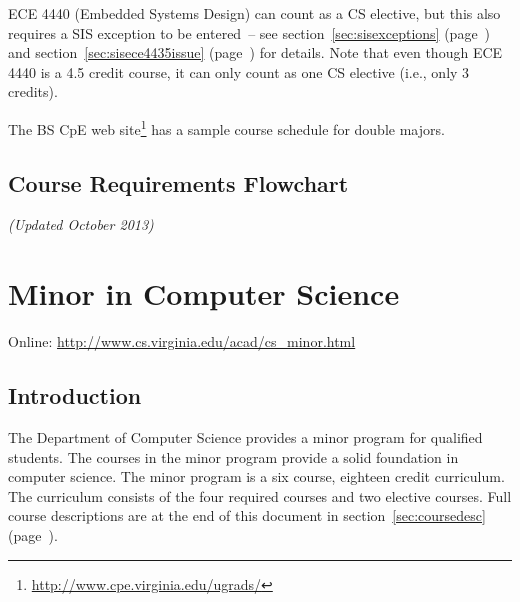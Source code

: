 \documentclass[10pt,letter,twocolumn]{book}
\newcommand{\mychapter}[2]{\chapter{#1}\renewcommand{\leftmark}{\textsc{#2}}}
\newcommand{\mysection}[1]{\section{#1}\renewcommand{\rightmark}{#1}}
\newcommand{\myurl}[1]{\footnote{\scriptsize\url{#1}}}
\begin{document}
ECE 4440 (Embedded Systems Design) can count as a CS elective, but
this also requires a SIS exception to be entered~-- see
section~\ref{sec:sisexceptions} (page~\pageref{sec:sisexceptions})
and section~\ref{sec:sisece4435issue} (page~\pageref{sec:sisece4435issue})
for details.  Note that even though ECE 4440 is a 4.5 credit course,
it can only count as one CS elective (i.e., only 3 credits).

The BS CpE web site\myurl{http://www.cpe.virginia.edu/ugrads/} has a
sample course schedule for double majors.



\begin{figure*}[h!]
\mysection{Course Requirements Flowchart}
{\em (Updated October 2013)}
\begin{center}
\end{center}
\end{figure*}



\clearpage
\mychapter{Minor in Computer Science}{CS Minor}
\label{sec:csminor}

\noindent Online: \url{http://www.cs.virginia.edu/acad/cs_minor.html}



\mysection{Introduction}

The Department of Computer Science provides a minor program for
qualified students. The courses in the minor program provide a solid
foundation in computer science. The minor program is a six course,
eighteen credit curriculum. The curriculum consists of the four
required courses and two elective courses. Full course descriptions
are at the end of this document in section~\ref{sec:coursedesc}
(page~\pageref{sec:coursedesc}).
\end{document}
